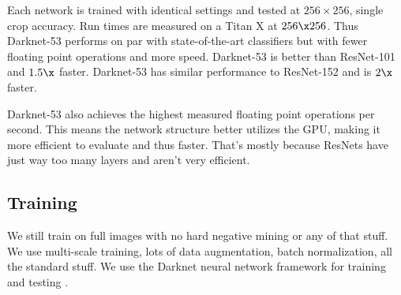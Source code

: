 Each network is trained with identical settings and tested at $256 \times 256$, single crop accuracy. Run times are measured on a Titan X at $256 \x 256$. Thus Darknet-53 performs on par with state-of-the-art classifiers but with fewer floating point operations and more speed. Darknet-53 is better than ResNet-101 and $1.5\x$ faster. Darknet-53 has similar performance to ResNet-152 and is $2\x$ faster.

Darknet-53 also achieves the highest measured floating point operations per second. This means the network structure better utilizes the GPU, making it more efficient to evaluate and thus faster. That's mostly because ResNets have just way too many layers and aren't very efficient.


\subsection{Training}

We still train on full images with no hard negative mining or any of that stuff. We use multi-scale training, lots of data augmentation, batch normalization, all the standard stuff. We use the Darknet neural network framework for training and testing \cite{darknet13}.


